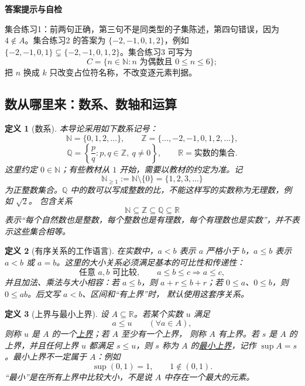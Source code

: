 \documentclass[UTF8,fontset=none,a4paper,11pt]{ctexart}
\theoremstyle{foundation-definition}
\newtheorem{definition}{定义}[section]
\theoremstyle{foundation-theorem}
\theoremstyle{foundation-proposition}
\theoremstyle{foundation-example}
\theoremstyle{foundation-remark}
\theoremstyle{foundation-theorem}
\newcommand{\term}[2]{\hyperref[#1]{#2}}
\newenvironment{answerkey}{%
\begin{mdframed}[backgroundcolor=examplebg,linecolor=examplepurple,linewidth=1.0pt,
  leftline=true,rightline=false,topline=false,bottomline=false,
  skipabove=7pt,skipbelow=8pt,innerleftmargin=10pt,innerrightmargin=8pt,
  innertopmargin=6pt,innerbottommargin=6pt]
{\sffamily\bfseries\color{examplepurple}答案提示与自检}\par\smallskip\small
}{\end{mdframed}}
\begin{document}
\begin{answerkey}
集合练习1：前两句正确，第三句不是同类型的子集陈述，第四句错误，因为 \(4\notin A\)。集合练习2 的答案为 \(\{-2,-1,0,1,2\}\)，例如 \(\{-2,-1,0,1\}\subsetneq\{-2,-1,0,1,2\}\)。集合练习3 可写为
\[
C=\{n\in\mathbb N:n\text{ 为偶数且 }0\le n\le6\};
\]
把 \(n\) 换成 \(k\) 只改变占位符名称，不改变逐元素判据。
\end{answerkey}

\subsection{数从哪里来：数系、数轴和运算}

\begin{definition}[数系]\label{def:number-systems}
本导论采用如下数系记号：
\[
\mathbb N=\{0,1,2,\ldots\},\qquad
\mathbb Z=\{\ldots,-2,-1,0,1,2,\ldots\},
\]
\[
\mathbb Q=\left\{\frac pq:p,q\in\mathbb Z,\ q\ne0\right\},
\qquad
\mathbb R=\text{实数的集合}.
\]
这里约定 \(0\in\mathbb N\)；有些教材从 \(1\) 开始，需要以教材的约定为准。记
\[
\mathbb N_{\ge1}:=\mathbb N\setminus\{0\}=\{1,2,3,\ldots\}
\]
为正整数集合。\(\mathbb Q\) 中的数可以写成整数的比，不能这样写的实数称为无理数，例如 \(\sqrt2\)。
包含关系
\[
\mathbb N\subseteq\mathbb Z\subseteq\mathbb Q\subseteq\mathbb R
\]
表示“每个自然数也是整数，每个整数也是有理数，每个有理数也是实数”，并不表示这些集合相等。
\end{definition}

\begin{definition}[有序关系的工作语言]\label{def:ordered-relation}
在实数中，\(a<b\) 表示 \(a\) 严格小于 \(b\)，\(a\le b\) 表示
\(a<b\) 或 \(a=b\)。这里的大小关系必须满足基本的可比性和传递性：
\[
\text{任意 }a,b\text{ 可比较},\qquad
a\le b\le c\Longrightarrow a\le c,
\]
并且加法、乘法与大小相容：若 \(a\le b\)，则 \(a+r\le b+r\)；若
\(0\le a\)、\(0\le b\)，则 \(0\le ab\)。后文写 \(a<b\)、区间和“有上界”时，
默认使用这套序关系。
\end{definition}

\begin{definition}[上界与最小上界]\label{def:upper-bound-supremum}\label{def:upper-bound}\label{def:supremum}
设 \(A\subseteq\mathbb R\)。若某个实数 \(u\) 满足
\[
a\le u\qquad(\forall a\in A),
\]
则称 \(u\) 是 \(A\) 的一个\term{def:upper-bound}{上界}；若 \(A\) 至少有一个上界，
则称 \(A\) 有上界。若 \(s\) 是 \(A\) 的上界，并且任何上界 \(u\) 都满足
\(s\le u\)，则 \(s\) 称为 \(A\) 的\term{def:supremum}{最小上界}，记作
\(\sup A=s\)。最小上界不一定属于 \(A\)：例如
\[
\sup(0,1)=1,\qquad 1\notin(0,1).
\]
“最小”是在所有上界中比较大小，不是说 \(A\) 中存在一个最大的元素。
\end{definition}
\end{document}
